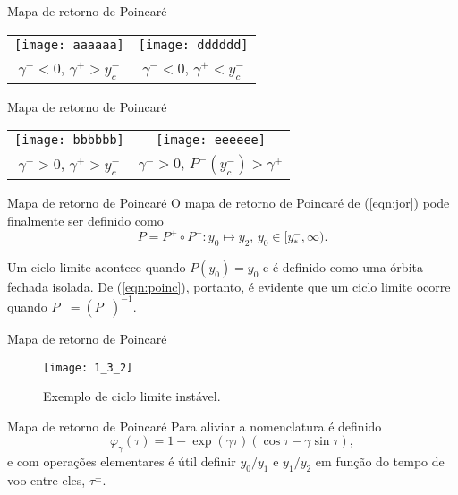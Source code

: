 \documentclass[aspectratio=169]{beamer}
\begin{document}
\begin{frame}{Mapa de retorno de Poincaré}
\begin{tabular}{cc}
\centering
\texttt{[image: aaaaaa]}
&
\texttt{[image: dddddd]}\\
\small$\gamma^-<0$, $\gamma^+>y_c^-$&\small$\gamma^-<0$, $\gamma^+<y_c^-$
\end{tabular}
\end{frame}

\begin{frame}{Mapa de retorno de Poincaré}
\begin{tabular}{cc}
\centering
    \texttt{[image: bbbbbb]}
    &
\texttt{[image: eeeeee]}\\
\small$\gamma^->0$, $\gamma^+>y_c^-$&\small$\gamma^->0$, $P^-(y_c^-)>\gamma^+$
\end{tabular}
\end{frame}

\begin{frame}{Mapa de retorno de Poincaré}
    O mapa de retorno de Poincaré de (\ref{eqn:jor}) pode finalmente ser definido como
\begin{equation}
\label{eqn:poinc}
P=P^+\circ P^-: y_0\mapsto y_2\text{,  }y_0\in[y_*^-, \infty).
\end{equation}

\pause Um ciclo limite acontece quando $P(y_0)=y_0$ e é definido como uma órbita fechada isolada. De (\ref{eqn:poinc}), portanto, é evidente que um ciclo limite ocorre quando $P^-=(P^+)^{-1}$.
\end{frame}

\begin{frame}{Mapa de retorno de Poincaré}
    \begin{figure}
        \centering
        \texttt{[image: 1\_3\_2]}
        \caption{Exemplo de ciclo limite instável.}
        \label{fig:my_label}
    \end{figure}
\end{frame}

\begin{frame}{Mapa de retorno de Poincaré}
    Para aliviar a nomenclatura é definido
\begin{equation}
\label{phi}
\varphi_{\gamma}(\tau)=1-\exp (\gamma \tau) (\cos \tau-\gamma \sin \tau),
\end{equation}
e com operações elementares é útil definir $y_0/y_1$ e $y_1/y_2$ em função do tempo de voo entre eles, $\tau^{\pm}$.
\end{frame}
\end{document}
